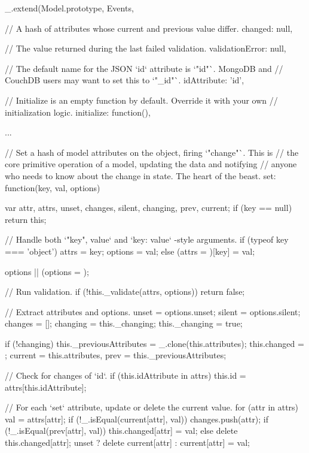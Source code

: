 \begin{JavaScript}
  _.extend(Model.prototype, Events, {

    // A hash of attributes whose current and previous value differ.
    changed: null,

    // The value returned during the last failed validation.
    validationError: null,

    // The default name for the JSON `id` attribute is `"id"`. MongoDB and
    // CouchDB users may want to set this to `"_id"`.
    idAttribute: 'id',

    // Initialize is an empty function by default. Override it with your own
    // initialization logic.
    initialize: function(){},
	
    ...

    // Set a hash of model attributes on the object, firing `"change"`. This is
    // the core primitive operation of a model, updating the data and notifying
    // anyone who needs to know about the change in state. The heart of the beast.
    set: function(key, val, options) {
      var attr, attrs, unset, changes, silent, changing, prev, current;
      if (key == null) return this;

      // Handle both `"key", value` and `{key: value}` -style arguments.
      if (typeof key === 'object') {
        attrs = key;
        options = val;
      } else {
        (attrs = {})[key] = val;
      }

      options || (options = {});

      // Run validation.
      if (!this._validate(attrs, options)) return false;

      // Extract attributes and options.
      unset           = options.unset;
      silent          = options.silent;
      changes         = [];
      changing        = this._changing;
      this._changing  = true;

      if (!changing) {
        this._previousAttributes = _.clone(this.attributes);
        this.changed = {};
      }
      current = this.attributes, prev = this._previousAttributes;

      // Check for changes of `id`.
      if (this.idAttribute in attrs) this.id = attrs[this.idAttribute];

      // For each `set` attribute, update or delete the current value.
      for (attr in attrs) {
        val = attrs[attr];
        if (!_.isEqual(current[attr], val)) changes.push(attr);
        if (!_.isEqual(prev[attr], val)) {
          this.changed[attr] = val;
        } else {
          delete this.changed[attr];
        }
        unset ? delete current[attr] : current[attr] = val;
      }

}}
\end{JavaScript}
